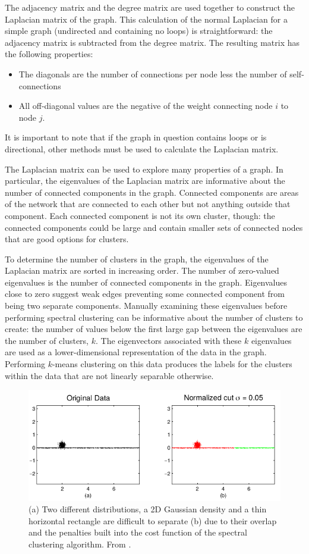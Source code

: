The adjacency matrix and the degree matrix are used together to construct the Laplacian matrix of the graph. This calculation of the normal Laplacian for a simple graph (undirected and containing no loops) is straightforward: the adjacency matrix is subtracted from the degree matrix. The resulting matrix has the following properties:
\begin{itemize}
\item The diagonals are the number of connections per node less the number of self-connections
\item All off-diagonal values are the negative of the weight connecting node $i$ to node $j$.
\end{itemize}
It is important to note that if the graph in question contains loops or is directional, other methods must be used to calculate the Laplacian matrix. 

The Laplacian matrix can be used to explore many properties of a graph. In particular, the eigenvalues of the Laplacian matrix are informative about the number of connected components in the graph. Connected components are areas of the network that are connected to each other but not anything outside that component. Each connected component is not its own cluster, though: the connected components could be large and contain smaller sets of connected nodes that are good options for clusters.

To determine the number of clusters in the graph, the eigenvalues of the Laplacian matrix are sorted in increasing order. The number of zero-valued eigenvalues is the number of connected components in the graph. Eigenvalues close to zero suggest weak edges preventing some connected component from being two separate components. Manually examining these eigenvalues before performing spectral clustering can be informative about the number of clusters to create: the number of values below the first large gap between the eigenvalues are the number of clusters, $k$. The eigenvectors associated with these $k$ eigenvalues are used as a lower-dimensional representation of the data in the graph. Performing $k$-means clustering on this data produces the labels for the clusters within the data that are not linearly separable otherwise.

\begin{figure}
\includegraphics[width=.75\textwidth]{4/spectral_clustering_limitation.png}
\caption{(a) Two different distributions, a 2D Gaussian density and a thin horizontal rectangle are difficult to separate (b) due to their overlap and the penalties built into the cost function of the spectral clustering algorithm. From \cite{Nadler2007}.}
\label{ch4:fig:spect-clust-lim-01}
\end{figure}

